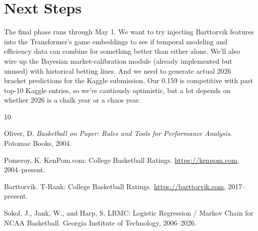 \documentclass[11pt,a4paper]{article}
\begin{document}
\section{Next Steps}

The final phase runs through May 1. We want to try injecting Barttorvik features into the Transformer's game embeddings to see if temporal modeling and efficiency data can combine for something better than either alone. We'll also wire up the Bayesian market-calibration module (already implemented but unused) with historical betting lines. And we need to generate actual 2026 bracket predictions for the Kaggle submission. Our 0.159 is competitive with past top-10 Kaggle entries, so we're cautiously optimistic, but a lot depends on whether 2026 is a chalk year or a chaos year.




\begin{thebibliography}{10}

Oliver, D.
\newblock \emph{Basketball on Paper: Rules and Tools for Performance Analysis}.
\newblock Potomac Books, 2004.

Pomeroy, K.
\newblock KenPom.com: College Basketball Ratings.
\newblock \url{https://kenpom.com}, 2004--present.

Barttorvik.
\newblock T-Rank: College Basketball Ratings.
\newblock \url{https://barttorvik.com}, 2017--present.

Sokol, J., Jank, W., and Harp, S.
\newblock LRMC: Logistic Regression / Markov Chain for NCAA Basketball.
\newblock Georgia Institute of Technology, 2006--2026.

\end{thebibliography}
\end{document}
